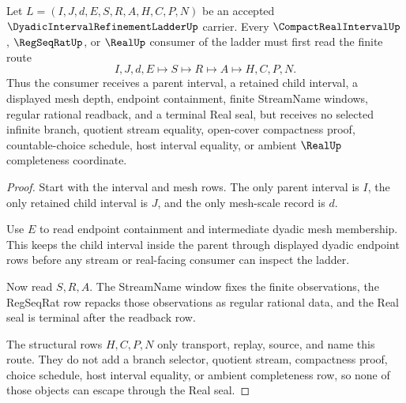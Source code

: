 \begin{theorem}
\label{thm:dyadic-interval-refinement-ladder-real-seal-nonescape}
Let $L=(I,J,d,E,S,R,A,H,C,P,N)$ be an accepted $\DyadicIntervalRefinementLadderUp$ carrier. Every $\CompactRealIntervalUp$, $\RegSeqRatUp$, or $\RealUp$ consumer of the ladder must first read the finite route
$$
I,J,d,E \longmapsto S \longmapsto R \longmapsto A \longmapsto H,C,P,N .
$$
Thus the consumer receives a parent interval, a retained child interval, a displayed mesh depth, endpoint containment, finite StreamName windows, regular rational readback, and a terminal Real seal, but receives no selected infinite branch, quotient stream equality, open-cover compactness proof, countable-choice schedule, host interval equality, or ambient $\RealUp$ completeness coordinate.
\end{theorem}
\begin{proof}
Start with the interval and mesh rows. The only parent interval is $I$, the only retained child interval is $J$, and the only mesh-scale record is $d$.

Use $E$ to read endpoint containment and intermediate dyadic mesh membership. This keeps the child interval inside the parent through displayed dyadic endpoint rows before any stream or real-facing consumer can inspect the ladder.

Now read $S,R,A$. The StreamName window fixes the finite observations, the RegSeqRat row repacks those observations as regular rational data, and the Real seal is terminal after the readback row.

The structural rows $H,C,P,N$ only transport, replay, source, and name this route. They do not add a branch selector, quotient stream, compactness proof, choice schedule, host interval equality, or ambient completeness row, so none of those objects can escape through the Real seal.
\end{proof}


